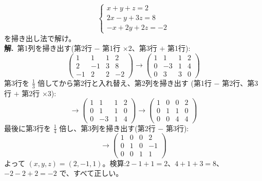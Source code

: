 \begin{rei}[例題・基本($3$ 元の方程式)]
\[
\begin{cases}
x + y + z = 2 \\
2x - y + 3z = 8 \\
-x + 2y + 2z = -2
\end{cases}
\]
を掃き出し法で解け。\\
\textbf{解.}\ 第1列を掃き出す(第2行 $-$ 第1行 $\times 2$、第3行 $+$ 第1行):
\[
\left(\begin{array}{ccc|c}
1 & 1 & 1 & 2 \\
2 & -1 & 3 & 8 \\
-1 & 2 & 2 & -2
\end{array}\right)
\longrightarrow
\left(\begin{array}{ccc|c}
1 & 1 & 1 & 2 \\
0 & -3 & 1 & 4 \\
0 & 3 & 3 & 0
\end{array}\right)
\]
第3行を $\frac{1}{3}$ 倍してから第2行と入れ替え、第2列を掃き出す
(第1行 $-$ 第2行、第3行 $+$ 第2行 $\times 3$):
\[
\longrightarrow
\left(\begin{array}{ccc|c}
1 & 1 & 1 & 2 \\
0 & 1 & 1 & 0 \\
0 & -3 & 1 & 4
\end{array}\right)
\longrightarrow
\left(\begin{array}{ccc|c}
1 & 0 & 0 & 2 \\
0 & 1 & 1 & 0 \\
0 & 0 & 4 & 4
\end{array}\right)
\]
最後に第3行を $\frac{1}{4}$ 倍し、第3列を掃き出す(第2行 $-$ 第3行):
\[
\longrightarrow
\left(\begin{array}{ccc|c}
1 & 0 & 0 & 2 \\
0 & 1 & 0 & -1 \\
0 & 0 & 1 & 1
\end{array}\right)
\]
よって $(x, y, z) = (2, -1, 1)$。検算:$2 - 1 + 1 = 2$、$4 + 1 + 3 = 8$、
$-2 - 2 + 2 = -2$ で、すべて正しい。
\end{rei}

